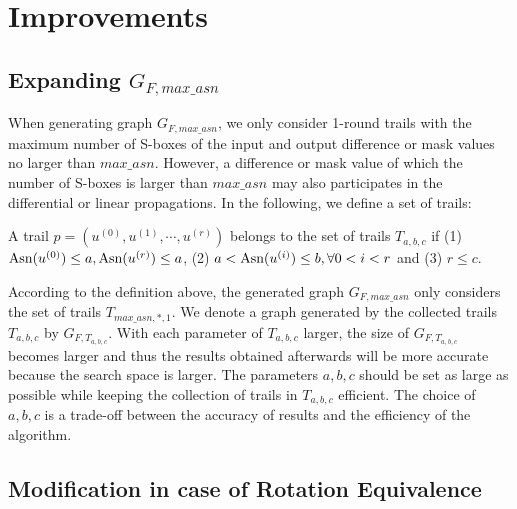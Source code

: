 


\section{Improvements}\label{sec:improvements}

\subsection{Expanding $G_{F,max\_asn}$}\label{sec:expansion}

When generating graph $G_{F,max\_asn}$, we only consider 1-round trails with the maximum number of S-boxes of the input and output difference or mask values no larger than $max\_asn$. However, a difference or mask value of which the number of S-boxes is larger than $max\_asn$ may also participates in the differential or linear propagations. In the following, we define a set of trails:

\begin{definition}
	A trail $p=(u^{(0)},u^{(1)},\cdots,u^{(r)})$ belongs to the set of trails $T_{a,b,c}$ if (1) $\text{Asn}(u^{(0)})\leq a,\text{Asn}(u^{(r)})\leq a$, (2) $a< \text{Asn}(u^{(i)})\leq b,\forall 0<i<r$ and (3) $r\leq c$.
\end{definition}

According to the definition above, the generated graph $G_{F,max\_asn}$ only considers the set of trails $T_{max\_asn,*,1}$. We denote a graph generated by the collected trails $T_{a,b,c}$ by $G_{F,T_{a,b,c}}$. With each parameter of $T_{a,b,c}$ larger, the size of $G_{F,T_{a,b,c}}$ becomes larger and thus the results obtained afterwards will be more accurate because the search space is larger. The parameters $a,b,c$ should be set as large as possible while keeping the collection of trails in $T_{a,b,c}$ efficient. The choice of $a,b,c$ is a trade-off between the accuracy of results and the efficiency of the algorithm.

\subsection{Modification in case of Rotation Equivalence}

